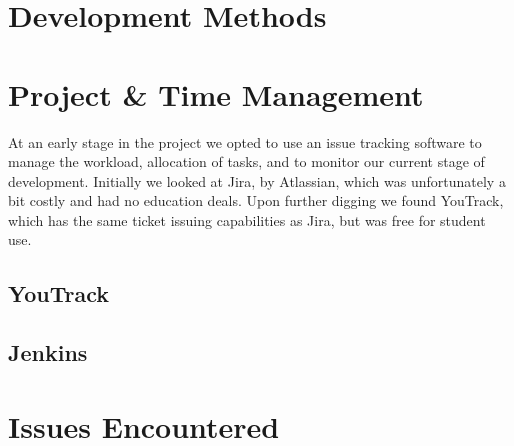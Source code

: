 \section{Development Methods}

\section{Project \& Time Management}
At an early stage in the project we opted to use an issue tracking software to manage the workload, allocation of tasks, and to monitor our current stage of development.
Initially we looked at Jira, by Atlassian, which was unfortunately a bit costly and had no education deals. Upon further digging we found YouTrack, which has the same ticket issuing capabilities as Jira, but was free for student use.
\subsection{YouTrack}
\subsection{Jenkins}
\section{Issues Encountered}